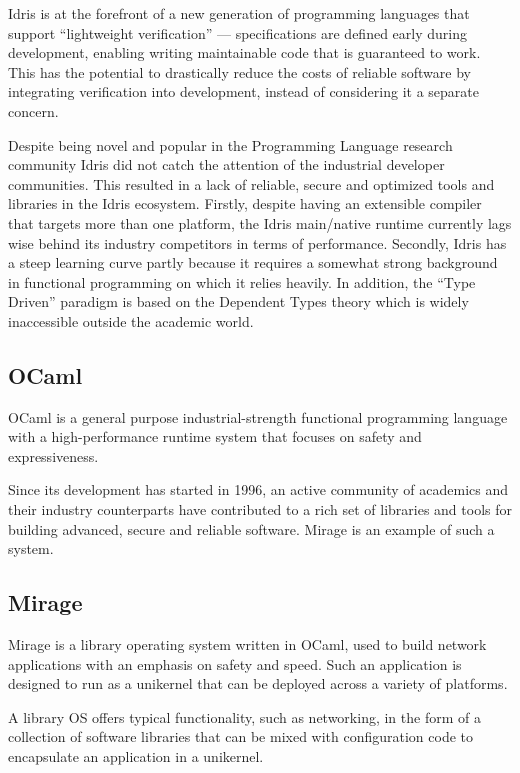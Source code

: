 \documentclass[a4paper, 12pt, oneside]{report}
\begin{document}
Idris is at the forefront of a new generation of programming languages
that support “lightweight verification” --- specifications are defined
early during development, enabling writing maintainable code that is
guaranteed to work.
This has the potential to drastically reduce the costs of reliable software by
integrating verification into development, instead of considering it a separate
concern.

Despite being novel and popular in the Programming Language research community
Idris did not catch the attention of the industrial developer communities.
This resulted in a lack of reliable, secure and optimized tools and libraries
in the Idris ecosystem.
Firstly, despite having an extensible compiler that targets more than one
platform, the Idris main/native runtime currently lags wise behind
its industry competitors in terms of performance.
Secondly, Idris has a steep learning curve partly because it requires
a somewhat strong background in functional programming on which it relies
heavily.
In addition, the ``Type Driven'' paradigm is based on the Dependent Types
theory which is widely inaccessible outside the academic world.

\subsection{OCaml}
OCaml is a general purpose industrial-strength functional programming language
with a high-performance runtime system that focuses on safety and
expressiveness.

Since its development has started in 1996, an active community of
academics and their industry counterparts have contributed to a rich set of
libraries and tools for building advanced, secure and reliable software. Mirage
is an example of such a system.

\subsection{Mirage}
Mirage is a library operating system written in OCaml, used to build network
applications with an emphasis on safety and speed.
Such an application is designed to run as a unikernel that can be deployed
across a variety of platforms.

A library OS offers typical functionality, such as networking,
in the form of a collection of software libraries that can be mixed with
configuration code to encapsulate an application in a unikernel.
\end{document}
